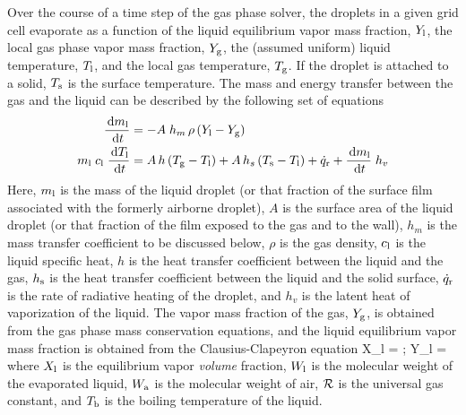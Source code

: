 Over the course of a time step of the gas phase solver, the droplets in a given grid cell evaporate as a function of the liquid equilibrium vapor mass fraction, $Y_{\rm l}$, the local gas phase vapor mass fraction, $Y_{\rm g}$, the (assumed uniform) liquid temperature, $T_{\rm l}$, and the local gas temperature, $T_{\rm g}$. If the droplet is attached to a solid, $T_{\rm s}$ is the surface temperature. The mass and energy transfer between the gas and the liquid can be described by the following set of equations~\cite{Cheremisinoff:1}
\begin{align}
\frac{\,\mathrm{d} m_{\rm l}}{\,\mathrm{d} t}               & =  - A \; h_m \, \rho \, (Y_{\rm l} - Y_{\rm g}) \\
m_{\rm l} \; c_{\rm l} \; \frac{\,\mathrm{d} T_{\rm l}}{\,\mathrm{d} t} & =    A \, h  \, (T_{\rm g}-T_{\rm l}) + A \, h_s \, (T_{\rm s}-T_{\rm l}) + \dot{q}_{\rm r} + \frac{\,\mathrm{d} m_{\rm l}}{\,\mathrm{d} t} \; h_v  \label{droplet_temp}   \end{align}
Here, $m_{\rm l}$ is the mass of the liquid droplet (or that fraction of the surface film associated with the formerly airborne droplet), $A$ is the surface area of the liquid droplet (or that fraction of the film exposed to the gas and to the wall), $h_m$ is the mass transfer coefficient to be discussed below,
$\rho$ is the gas density, $c_{\rm l}$ is the liquid specific heat, $h$ is the heat transfer coefficient between the liquid and the gas, $h_{\rm s}$ is the heat transfer coefficient between the liquid and the solid surface, $\dot{q}_{\rm r}$ is the rate of radiative heating of the droplet, and $h_v$ is the latent heat of vaporization of the liquid. The vapor mass fraction of the gas, $Y_{\rm g}$, is obtained from the gas phase mass conservation equations, and the liquid equilibrium vapor mass fraction is obtained from the Clausius-Clapeyron equation
\be X_{\rm l} = \exp {}  \quad ; \quad
      Y_{\rm l} =   \label{clausius_clapeyron} \ee
where $X_{\rm l}$ is the equilibrium vapor {\em volume} fraction, $W_{\rm l}$ is the molecular weight of the evaporated liquid, $W_{\rm a}$ is the molecular weight of air, $\cal R$ is the universal gas constant, and $T_{\rm b}$ is the boiling temperature of the liquid.

